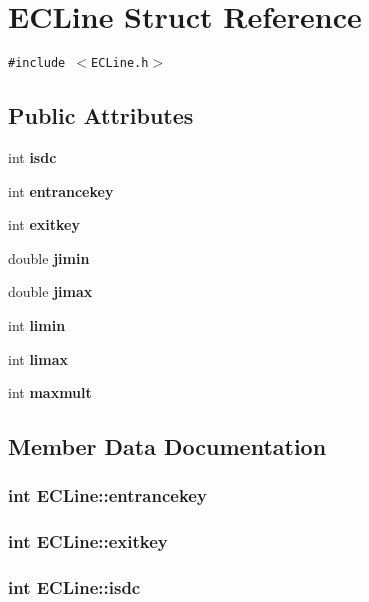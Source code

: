 \section{ECLine Struct Reference}
\label{structECLine}
{\tt \#include $<$ECLine.h$>$}

\subsection*{Public Attributes}
\begin{CompactItemize}
\item 
int \bf{isdc}
\item 
int \bf{entrancekey}
\item 
int \bf{exitkey}
\item 
double \bf{jimin}
\item 
double \bf{jimax}
\item 
int \bf{limin}
\item 
int \bf{limax}
\item 
int \bf{maxmult}
\end{CompactItemize}


\subsection{Member Data Documentation}
\subsubsection{\setlength{\rightskip}{0pt plus 5cm}int \bf{ECLine::entrancekey}}\label{structECLine_aa30d2cd5699c64b200e07f69578bcf9}


\subsubsection{\setlength{\rightskip}{0pt plus 5cm}int \bf{ECLine::exitkey}}\label{structECLine_6b4bf2bbffb6fbee94490e4d0168fa22}


\subsubsection{\setlength{\rightskip}{0pt plus 5cm}int \bf{ECLine::isdc}}\label{structECLine_c6d3158ecf95e5872f50b120c556d3fe}


